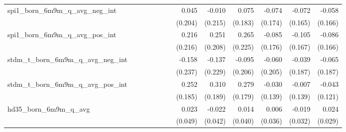 \begin{tabular}{lrrrrrrrrrrrr}
spi1\_born\_6m9m\_q\_avg\_neg\_int          &              &              &              &              &              &              &        0.045 &       -0.010 &        0.075 &       -0.074 &       -0.072 &       -0.058 \\ 
                                            &              &              &              &              &              &              &      (0.204) &      (0.215) &      (0.183) &      (0.174) &      (0.165) &      (0.166) \\ 
spi1\_born\_6m9m\_q\_avg\_pos\_int          &              &              &              &              &              &              &        0.216 &        0.251 &        0.265 &       -0.085 &       -0.105 &       -0.086 \\ 
                                            &              &              &              &              &              &              &      (0.216) &      (0.208) &      (0.225) &      (0.176) &      (0.167) &      (0.166) \\ 
stdm\_t\_born\_6m9m\_q\_avg\_neg\_int       &              &              &              &              &              &              &       -0.158 &       -0.137 &       -0.095 &       -0.060 &       -0.039 &       -0.065 \\ 
                                            &              &              &              &              &              &              &      (0.237) &      (0.229) &      (0.206) &      (0.205) &      (0.187) &      (0.187) \\ 
stdm\_t\_born\_6m9m\_q\_avg\_pos\_int       &              &              &              &              &              &              &        0.252 &        0.310 &        0.279 &       -0.030 &       -0.007 &       -0.043 \\ 
                                            &              &              &              &              &              &              &      (0.185) &      (0.189) &      (0.179) &      (0.139) &      (0.139) &      (0.121) \\ 
hd35\_born\_6m9m\_q\_avg                    &              &              &              &              &              &              &        0.023 &       -0.022 &        0.014 &        0.006 &       -0.019 &        0.024 \\ 
                                            &              &              &              &              &              &              &      (0.049) &      (0.042) &      (0.040) &      (0.036) &      (0.032) &      (0.029) \\ 

\end{tabular}
